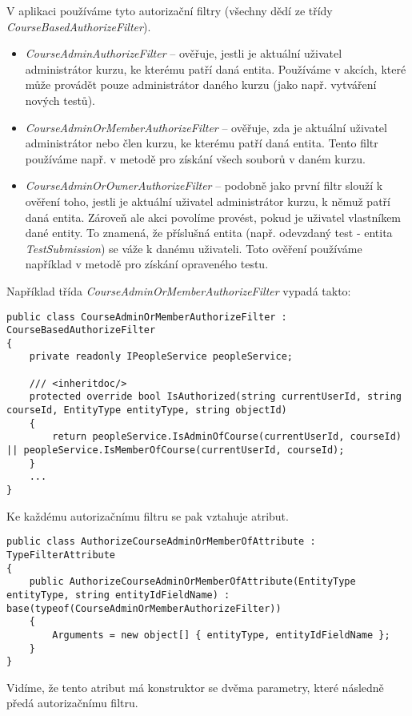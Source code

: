 V aplikaci používáme tyto autorizační filtry (všechny dědí ze třídy \textit{CourseBasedAuthorizeFilter}).
\begin{itemize}
	\item \textit{CourseAdminAuthorizeFilter} -- ověřuje, jestli je aktuální uživatel administrátor kurzu, ke kterému patří daná entita. Používáme v akcích, které může provádět pouze administrátor daného kurzu (jako např. vytváření nových testů).
	\item \textit{CourseAdminOrMemberAuthorizeFilter} -- ověřuje, zda je aktuální uživatel administrátor nebo člen kurzu, ke kterému patří daná entita. Tento filtr používáme např. v metodě pro získání všech souborů v daném kurzu.
	\item \textit{CourseAdminOrOwnerAuthorizeFilter} -- podobně jako první filtr slouží k ověření toho, jestli je aktuální uživatel administrátor kurzu, k němuž patří daná entita. Zároveň ale akci povolíme provést, pokud je uživatel vlastníkem dané entity. To znamená, že příslušná entita (např. odevzdaný test - entita \textit{TestSubmission}) se váže k danému uživateli. Toto ověření používáme například v metodě pro získání opraveného testu.
\end{itemize}

Například třída \textit{CourseAdminOrMemberAuthorizeFilter} vypadá takto:
\begin{lstlisting}
public class CourseAdminOrMemberAuthorizeFilter : CourseBasedAuthorizeFilter
{
	private readonly IPeopleService peopleService;
	
	/// <inheritdoc/>
	protected override bool IsAuthorized(string currentUserId, string courseId, EntityType entityType, string objectId)
	{
		return peopleService.IsAdminOfCourse(currentUserId, courseId) || peopleService.IsMemberOfCourse(currentUserId, courseId);
	}
	...
}
\end{lstlisting}

Ke každému autorizačnímu filtru se pak vztahuje atribut.
\begin{lstlisting}
public class AuthorizeCourseAdminOrMemberOfAttribute : TypeFilterAttribute
{
	public AuthorizeCourseAdminOrMemberOfAttribute(EntityType entityType, string entityIdFieldName) : base(typeof(CourseAdminOrMemberAuthorizeFilter))
	{
		Arguments = new object[] { entityType, entityIdFieldName };
	}
}
\end{lstlisting}

Vidíme, že tento atribut má konstruktor se dvěma parametry, které následně předá autorizačnímu filtru. 

